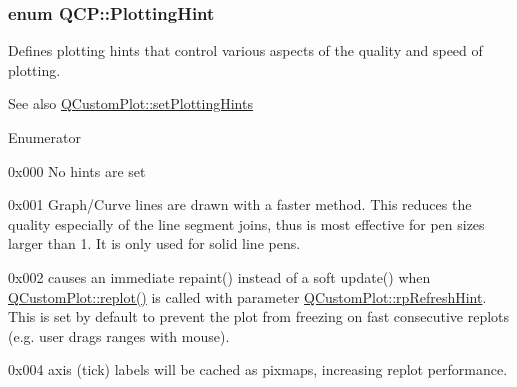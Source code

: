 \subsubsection[{\texorpdfstring{Plotting\+Hint}{PlottingHint}}]{\setlength{\rightskip}{0pt plus 5cm}enum {\bf Q\+C\+P\+::\+Plotting\+Hint}}\hypertarget{namespaceQCP_a5400e5fcb9528d92002ddb938c1f4ef4}{}\label{namespaceQCP_a5400e5fcb9528d92002ddb938c1f4ef4}
Defines plotting hints that control various aspects of the quality and speed of plotting.

\begin{DoxySeeAlso}{See also}
\hyperlink{classQCustomPlot_a94a33cbdadbbac5934843508bcfc210d}{Q\+Custom\+Plot\+::set\+Plotting\+Hints} 
\end{DoxySeeAlso}
\begin{Desc}
\item[Enumerator]\par
\begin{description}
\item[{\em 
ph\+None\hypertarget{namespaceQCP_a5400e5fcb9528d92002ddb938c1f4ef4ab7283c5bfc1ba9e597015389880bda42}{}\label{namespaceQCP_a5400e5fcb9528d92002ddb938c1f4ef4ab7283c5bfc1ba9e597015389880bda42}
}]{\ttfamily 0x000} No hints are set \item[{\em 
ph\+Fast\+Polylines\hypertarget{namespaceQCP_a5400e5fcb9528d92002ddb938c1f4ef4aa5fd227bc878c56ad2a87ea32c74ee4d}{}\label{namespaceQCP_a5400e5fcb9528d92002ddb938c1f4ef4aa5fd227bc878c56ad2a87ea32c74ee4d}
}]{\ttfamily 0x001} Graph/\+Curve lines are drawn with a faster method. This reduces the quality especially of the line segment joins, thus is most effective for pen sizes larger than 1. It is only used for solid line pens. \item[{\em 
ph\+Immediate\+Refresh\hypertarget{namespaceQCP_a5400e5fcb9528d92002ddb938c1f4ef4a30840fba10eebfa519a92cf5c3d32870}{}\label{namespaceQCP_a5400e5fcb9528d92002ddb938c1f4ef4a30840fba10eebfa519a92cf5c3d32870}
}]{\ttfamily 0x002} causes an immediate repaint() instead of a soft update() when \hyperlink{classQCustomPlot_aa4bfe7d70dbe67e81d877819b75ab9af}{Q\+Custom\+Plot\+::replot()} is called with parameter \hyperlink{classQCustomPlot_a45d61392d13042e712a956d27762aa39a49666a5854a68dbcca8b277b03331260}{Q\+Custom\+Plot\+::rp\+Refresh\+Hint}. This is set by default to prevent the plot from freezing on fast consecutive replots (e.\+g. user drags ranges with mouse). \item[{\em 
ph\+Cache\+Labels\hypertarget{namespaceQCP_a5400e5fcb9528d92002ddb938c1f4ef4a8e9cfe5ee0c5cd36dd7accf9739aff65}{}\label{namespaceQCP_a5400e5fcb9528d92002ddb938c1f4ef4a8e9cfe5ee0c5cd36dd7accf9739aff65}
}]{\ttfamily 0x004} axis (tick) labels will be cached as pixmaps, increasing replot performance. \end{description}
\end{Desc}
